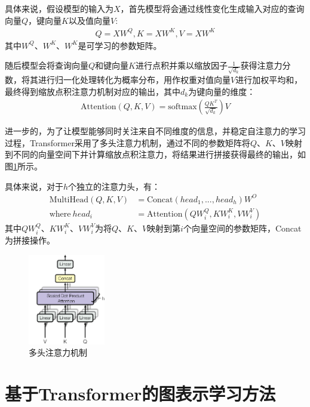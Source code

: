 具体来说，假设模型的输入为$X$，首先模型将会通过线性变化生成输入对应的查询向量$Q$，键向量$K$以及值向量$V$:
\begin{gather}
    Q=XW^Q, K=XW^K, V=XW^K
\end{gather}
其中$W^Q$、$W^K$、$W^K$是可学习的参数矩阵。

随后模型会将查询向量$Q$和键向量$K$进行点积并乘以缩放因子$\frac{1}{\sqrt{d_k}}$获得注意力分数，将其进行归一化处理转化为概率分布，用作权重对值向量$V$进行加权平均和，最终得到缩放点积注意力机制对应的输出，其中$d_k$为键向量的维度：
\begin{gather}
    \mbox{Attention}(Q,K,V) = \mbox{softmax}(\frac{QK^T}{\sqrt{d_k}})V
\end{gather}


进一步的，为了让模型能够同时关注来自不同维度的信息，并稳定自注意力的学习过程，Transformer采用了多头注意力机制，通过不同的参数矩阵将$Q$、$K$、$V$映射到不同的向量空间下并计算缩放点积注意力，将结果进行拼接获得最终的输出，如图\ref{MultiHeadAttention}所示。

具体来说，对于$h$个独立的注意力头，有：
\begin{equation}
  \begin{aligned}
    \mbox{MultiHead}(Q,K,V)&=\mbox{Concat}(head_1,...,head_h)W^O\\
    \mbox{where} \  head_i &=\mbox{Attention}(QW^Q_i,KW^K_i,VW^V_i)
  \end{aligned}
\end{equation}
其中$QW^Q_i$、$KW^K_i$、$VW^V_i$为将$Q$、$K$、$V$映射到第$i$个向量空间的参数矩阵，Concat为拼接操作。

\begin{figure}[htbp]
  \centerline{\includegraphics[width=0.3\textwidth]{pic/MultiHeadAttention.png}}
  \caption{多头注意力机制}
  \label{MultiHeadAttention}
\end{figure}
\section{基于Transformer的图表示学习方法}

